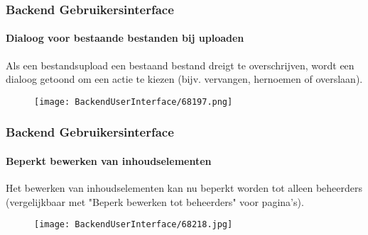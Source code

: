 \begin{frame}[fragile]
	\frametitle{Backend Gebruikersinterface}
	\framesubtitle{Dialoog voor bestaande bestanden bij uploaden}

	Als een bestandsupload een bestaand bestand dreigt te overschrijven, wordt een dialoog getoond
	om een actie te kiezen (bijv. vervangen, hernoemen of overslaan).

	\begin{figure}
		\texttt{[image: BackendUserInterface/68197.png]}
	\end{figure}

\end{frame}


\begin{frame}[fragile]
	\frametitle{Backend Gebruikersinterface}
	\framesubtitle{Beperkt bewerken van inhoudselementen}

	Het bewerken van inhoudselementen kan nu beperkt worden tot alleen beheerders
	(vergelijkbaar met "Beperk bewerken tot beheerders" voor pagina's).

	\begin{figure}
		\texttt{[image: BackendUserInterface/68218.jpg]}
	\end{figure}

\end{frame}

